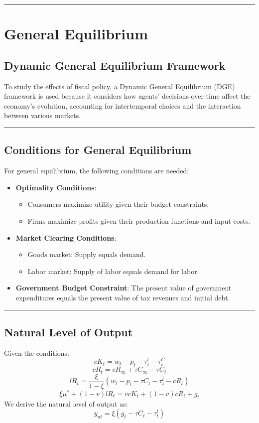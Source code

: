 \documentclass{article}
\begin{document}
\noindent\rule{\linewidth}{1pt}

\FloatBarrier{}

\section{General Equilibrium}

\subsection{Dynamic General Equilibrium Framework}
To study the effects of fiscal policy, a Dynamic General Equilibrium (DGE) framework is used because it considers how agents' decisions over time affect the economy's evolution, accounting for intertemporal choices and the interaction between various markets.

\noindent\rule{\linewidth}{0.5pt}

\subsection{Conditions for General Equilibrium}
For general equilibrium, the following conditions are needed:
\begin{itemize}
    \item \textbf{Optimality Conditions}:
        \begin{itemize}
            \item Consumers maximize utility given their budget constraints.
            \item Firms maximize profits given their production functions and input costs.
        \end{itemize}
    \item \textbf{Market Clearing Conditions}:
        \begin{itemize}
            \item Goods market: Supply equals demand.
            \item Labor market: Supply of labor equals demand for labor.
        \end{itemize}
    \item \textbf{Government Budget Constraint}: The present value of government expenditures equals the present value of tax revenues and initial debt.
\end{itemize}

\noindent\rule{\linewidth}{0.5pt}

\subsection{Natural Level of Output}
Given the conditions:
\[
cK_t = w_t - p_t - \tau^l_t - \tau^C_t
\]
\[
cR_t = cR_\infty + \tau C_\infty - \tau C_t
\]
\[
lR_t = \frac{\xi}{1-\xi} (w_t - p_t - \tau C_t - \tau^l_t - cR_t)
\]
\[
\xi \mu^* + (1 - v)lR_t = vcK_t + (1 - v)cR_t + g_t
\]
We derive the natural level of output as:
\[
y_{nt} = \xi (g_t - \tau C_t - \tau^l_t)
\]
\end{document}
